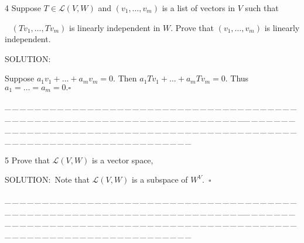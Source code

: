 \documentclass[a4paper, 11pt, UTF8]{article}
\def\Lm{\mathcal{L}}
\begin{document}
\begin{large}
{\timesbf\Large 4} {\timessl\Large 
Suppose $T\in\Lm(V,W)$ and $(v_1,\dots,v_m)$ is a list of vectors in $V$ such that}\par\,\,\,
{\timessl\Large $(Tv_1,\dots,Tv_m)$ is linearly independent in $W$. Prove that $(v_1,\dots,v_m)$ is linearly independent.
}\par
{\timesbf S\footnotesize{OLUTION:}}\par\quad
Suppose $a_1 v_1+\dots+a_m v_m=0$. Then $a_1 Tv_1+\dots+a_m Tv_m=0$. Thus $a_1=\dots=a_m=0.\square$\par
{\tiny \_\,\_\,\_\,\_\,\_\,\_\,\_\,\_\,\_\,\_\,\_\,\_\,\_\,\_\,\_\,\_\,\_\,\_\,\_\,\_\,\_\,\_\,\_\,\_\,\_\,\_\,\_\,\_\,\_\,\_\,\_\,\_\,\_\,\_\,\_\,\_\,\_\,\_\,\_\,\_\,\_\,\_\,\_\,\_\,\_\,\_\,\_\,\_\,\_\,\_\,\_\,\_\,\_\,\_\,\_\,\_\,\_\,\_\,\_\,\_\,\_\,\_\,\_\,\_\,\_\,\_\,\_\,\_\,\_\,\_\,\_\_\,\_\,\_\,\_\,\_\,\_\,\_\,\_\,\_\,\_\,\_\,\_\,\_\,\_\,\_\,\_\,\_\,\_\,\_\,\_\,\_\,\_\,\_\,\_\,\_\,\_\,\_\,\_\,\_\,\_\,\_\,\_\,\_\,\_\,\_\,\_\,\_\,\_\,\_\,\_\,\_\,\_\,\_\,\_\,\_\,\_\,\_\,\_\,\_\,\_\,\_\,\_\,\_\,\_\,\_\,\_\,\_\,\_\,\_\,\_\,\_\,\_\,\_\,\_\,\_\,\_\,\_\,\_\,\_\,\_\,\_}\par

{\timesbf\Large 5} {\timessl\Large 
Prove that $\Lm(V, W)$ is a vector space,
}\par
{\timesbf S\footnotesize{OLUTION:}}\,\,\,Note that $\Lm(V, W)$ is a subspace of $W^V$.$\,\,\,\square$\par
{\tiny \_\,\_\,\_\,\_\,\_\,\_\,\_\,\_\,\_\,\_\,\_\,\_\,\_\,\_\,\_\,\_\,\_\,\_\,\_\,\_\,\_\,\_\,\_\,\_\,\_\,\_\,\_\,\_\,\_\,\_\,\_\,\_\,\_\,\_\,\_\,\_\,\_\,\_\,\_\,\_\,\_\,\_\,\_\,\_\,\_\,\_\,\_\,\_\,\_\,\_\,\_\,\_\,\_\,\_\,\_\,\_\,\_\,\_\,\_\,\_\,\_\,\_\,\_\,\_\,\_\,\_\,\_\,\_\,\_\,\_\,\_\_\,\_\,\_\,\_\,\_\,\_\,\_\,\_\,\_\,\_\,\_\,\_\,\_\,\_\,\_\,\_\,\_\,\_\,\_\,\_\,\_\,\_\,\_\,\_\,\_\,\_\,\_\,\_\,\_\,\_\,\_\,\_\,\_\,\_\,\_\,\_\,\_\,\_\,\_\,\_\,\_\,\_\,\_\,\_\,\_\,\_\,\_\,\_\,\_\,\_\,\_\,\_\,\_\,\_\,\_\,\_\,\_\,\_\,\_\,\_\,\_\,\_\,\_\,\_\,\_\,\_\,\_\,\_\,\_\,\_\,\_}\par


\end{large}
\end{document}
